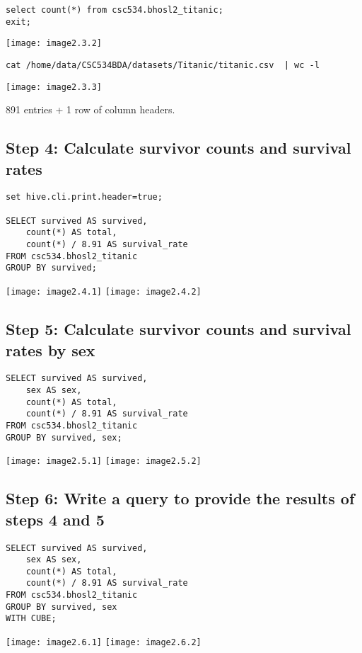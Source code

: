 \documentclass[]{article}
\begin{document}
\begin{verbatim}
select count(*) from csc534.bhosl2_titanic;
exit;
\end{verbatim}
\texttt{[image: image2.3.2]} %

\begin{verbatim}
cat /home/data/CSC534BDA/datasets/Titanic/titanic.csv  | wc -l
\end{verbatim}
\texttt{[image: image2.3.3]} %

891 entries + 1 row of column headers.

\subsection*{Step 4: Calculate survivor counts and survival rates}

\begin{verbatim}
set hive.cli.print.header=true;

SELECT survived AS survived,
	count(*) AS total,
	count(*) / 8.91 AS survival_rate
FROM csc534.bhosl2_titanic
GROUP BY survived;
\end{verbatim}
\texttt{[image: image2.4.1]} %
\texttt{[image: image2.4.2]} %

\subsection*{Step 5: Calculate survivor counts and survival rates by sex}

\begin{verbatim}
SELECT survived AS survived,
	sex AS sex,
	count(*) AS total,
	count(*) / 8.91 AS survival_rate
FROM csc534.bhosl2_titanic
GROUP BY survived, sex;
\end{verbatim}
\texttt{[image: image2.5.1]} %
\texttt{[image: image2.5.2]} %

\subsection*{Step 6: Write a query to provide the results of steps 4 and 5}

\begin{verbatim}
SELECT survived AS survived,
	sex AS sex,
	count(*) AS total,
	count(*) / 8.91 AS survival_rate
FROM csc534.bhosl2_titanic
GROUP BY survived, sex
WITH CUBE;
\end{verbatim}
\texttt{[image: image2.6.1]} %
\texttt{[image: image2.6.2]} %
\end{document}
